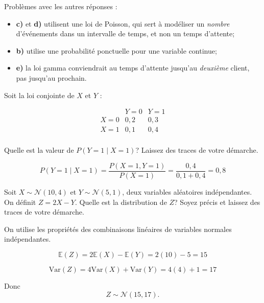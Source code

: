 \begin{questions}
\begin{solution}
Problèmes avec les autres réponses : 
\begin{itemize}
\item \textbf{c)} et \textbf{d)} utilisent une loi de Poisson, qui sert à modéliser un \emph{nombre} d’événements dans un intervalle de temps, et non un temps d’attente;
\item \textbf{b)} utilise une probabilité ponctuelle pour une variable continue;
\item \textbf{e)} la loi gamma conviendrait au temps d’attente jusqu’au \emph{deuxième} client, pas jusqu’au prochain.
\end{itemize}
\end{solution}


\vspace{0.3in}

\question[4]
Soit la loi conjointe de $X$ et $Y$ :

$$
\begin{array}{c|cc}
 & Y=0 & Y=1 \\
\hline
X=0 & 0{,}2 & 0{,}3 \\
X=1 & 0{,}1 & 0{,}4 \\
\end{array}
$$

Quelle est la valeur de $P(Y=1 \mid X=1)$? Laissez des traces de votre démarche.


\begin{solution}
$$
P(Y=1 \mid X=1)=\frac{P(X=1,Y=1)}{P(X=1)}=\frac{0{,}4}{0{,}1+0{,}4}=0{,}8
$$
\end{solution}

\newpage

\question[4]
Soit $X \sim \mathcal{N}(10, 4)$ et $Y \sim \mathcal{N}(5, 1)$, deux variables aléatoires indépendantes. \\
On définit $Z = 2X - Y$. Quelle est la distribution de $Z$? Soyez précis et laissez des traces de votre démarche.


\begin{solution}
On utilise les propriétés des combinaisons linéaires de variables normales indépendantes.

$$
\mathbb{E}(Z) = 2\mathbb{E}(X) - \mathbb{E}(Y) = 2(10) - 5 = 15
$$

$$
\mathrm{Var}(Z) = 4\mathrm{Var}(X) + \mathrm{Var}(Y) = 4(4) + 1 = 17
$$

Donc
$$
Z \sim \mathcal{N}(15, 17).
$$

\end{solution}

\vspace{3in}


\end{questions}
